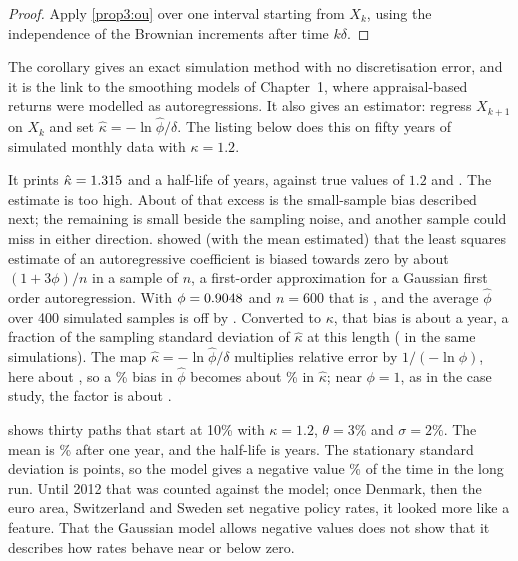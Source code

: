 \begin{chapterrefs}
\begin{proof}
Apply \cref{prop3:ou} over one interval starting from $X_k$, using the independence of the
Brownian increments after time $k\delta$.
\end{proof}

The corollary gives an exact simulation method with no discretisation error, and it is the link to
the smoothing models of Chapter~1, where appraisal-based returns were modelled as autoregressions. It
also gives an estimator: regress $X_{k+1}$ on $X_k$ and set $\hat\kappa=-\ln\hat\phi/\delta$. The listing
below does this on fifty years of simulated monthly data with $\kappa=1.2$.

It prints $\hat\kappa=1.315$ and a half-life of \snipHalf{} years, against true values of $1.2$ and
\ouHalfLife. The estimate is \snipExcess{} too high. About \ouKendallKappa{} of that excess is the small-sample bias described next; the remaining
\snipExcessRest{} is small beside the sampling noise, and another sample could miss in either direction. \textcite{kendall1954} showed (with the mean
estimated) that the least squares estimate of an autoregressive coefficient is biased towards zero by
about $(1+3\phi)/n$ in a sample of $n$, a first-order approximation for a Gaussian first order
autoregression. With $\phi=0.9048$ and $n=600$ that is \ouKendall, and the
average $\hat\phi$ over 400 simulated samples is off by \ouPhiBias. Converted to $\kappa$, that bias is about \ouKendallKappa{} a year, a
fraction of the sampling standard deviation of $\hat\kappa$ at this length (\ouKappaSd{} in the same
simulations). The map $\hat\kappa=-\ln\hat\phi/\delta$ multiplies relative error by $1/(-\ln\phi)$, here about
\ouAmp, so a \ouPhiBiasRel\% bias in $\hat\phi$ becomes about \ouKappaBiasRel\% in $\hat\kappa$; near $\phi=1$,
as in the case study, the factor is about \caseAmp.

 shows thirty paths that start at 10\% with $\kappa=1.2$, $\theta=3\%$ and $\sigma=2\%$. The
mean is \ouMeanOne\% after one year, and the half-life is \ouHalfLife{} years. The stationary standard
deviation is \ouSdInf{} points, so the model gives a negative value \ouProbNeg\% of the time in the long
run. Until 2012 that was counted against the model; once Denmark, then the euro area, Switzerland and
Sweden set negative policy rates, it looked more like a feature. That the Gaussian model allows
negative values does not show that it describes how rates behave near or below zero.


\end{chapterrefs}
